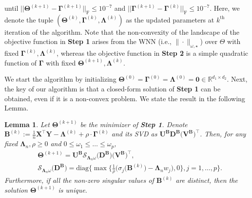 \documentclass[12pt]{article}
\newtheorem{lemma}[theorem]{Lemma}
\begin{document}
until $|| \boldsymbol{\Theta}^{(k+1)}-\boldsymbol{\Gamma}^{(k+1)} ||_{\text{F}}\leq 10^{-7}$ and $|| \boldsymbol{\Gamma}^{(k+1)}-\boldsymbol{\Gamma}^{(k)} ||_{\text{F}}\leq 10^{-7}$.
Here, we denote the tuple $(\boldsymbol{\Theta}^{(k)},\boldsymbol{\Gamma}^{(k)},\boldsymbol{\Lambda}^{(k)})$ as the updated parameters at $k^{\text{th}}$ iteration of the algorithm.
Note that the non-convexity of the landscape of the objective function in \textbf{Step 1} arises from the WNN  (i.e., $\|\cdot\|_{\omega,\star}$) over $\Theta$ with fixed $\boldsymbol{\Gamma}^{(k)},\boldsymbol{\Lambda}^{(k)}$, whereas the objective function in \textbf{Step 2} is a simple quadratic function of $\boldsymbol{\Gamma}$ with fixed $\boldsymbol{\Theta}^{(k+1)},\boldsymbol{\Lambda}^{(k)}$. 

We start the algorithm by initializing  $\boldsymbol{\Theta}^{(0)}=\boldsymbol{\Gamma}^{(0)}=\boldsymbol{\Lambda}^{(0)}=\boldsymbol{0} \in\mathbb{R}^{d_{1}\times d_{2}}$.
Next, the key of our algorithm is that a closed-form solution of \textbf{Step 1} can be obtained, even if it is a non-convex problem. 
We state the result in the following Lemma.
\begin{lemma} \label{Lemma2.1}
    Let $\boldsymbol{\Theta}^{(k+1)}$ be the minimizer of \textbf{Step 1}.
    Denote $\boldsymbol{B}^{(k)}:=\frac{1}{n}\boldsymbol{X}^{\top}\boldsymbol{Y}-\boldsymbol{\Lambda}^{(k)}+\rho \cdot \boldsymbol{\Gamma}^{(k)}$ and its SVD as $\boldsymbol{U}^{\textbf{B}}\boldsymbol{D}^{\textbf{B}}\big(\boldsymbol{V}^{\textbf{B}}\big)^{\top}$.
    Then, for any fixed $\boldsymbol{\Lambda}_{n}, \rho \geq 0 $ and $0\leq \omega_{1} \leq \dots \leq \omega_{p}$, 
    \begin{align*}
        &\boldsymbol{\Theta}^{(k+1)} = \boldsymbol{U}^{\textbf{B}}\mathcal{S}_{\boldsymbol{\Lambda}_{n}\omega}\big(\boldsymbol{D}^{\textbf{B}}\big)\big(\boldsymbol{V}^{\textbf{B}}\big)^{\top}, \\ 
        &\mathcal{S}_{\boldsymbol{\Lambda}_{n}\omega}\big(\boldsymbol{D}^{\textbf{B}}\big) = \text{diag}\bigg\{ \max\bigg\{\frac{1}{\rho}\big(\sigma_{j}(\boldsymbol{B}^{(k)}\big)-\boldsymbol{\Lambda}_{n} w_{j}\big),0 \bigg\},  j=1,\dots,p \bigg\}.
    \end{align*}
    Furthermore, if all the non-zero singular values of $\boldsymbol{B}^{(k)}$ are distinct, then the solution $\boldsymbol{\Theta}^{(k+1)}$ is unique.
\end{lemma}
\end{document}
